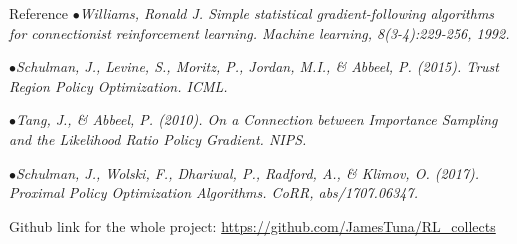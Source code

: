 \begin{frame}{Reference}
    $\bullet$\hspace{0.2cm}\textit{Williams, Ronald J. Simple statistical gradient-following algorithms for connectionist reinforcement learning. Machine learning, 8(3-4):229-256, 1992.}\\\vspace{0.2cm}

    $\bullet$\hspace{0.2cm}\textit{Schulman, J., Levine, S., Moritz, P., Jordan, M.I., \& Abbeel, P. (2015). Trust Region Policy Optimization. ICML.}\\\vspace{0.2cm}

    $\bullet$\hspace{0.2cm}\textit{Tang, J., \& Abbeel, P. (2010). On a Connection between Importance Sampling and the Likelihood Ratio Policy Gradient. NIPS.}\\\vspace{0.2cm}
    
    $\bullet$\hspace{0.2cm}\textit{Schulman, J., Wolski, F., Dhariwal, P., Radford, A., \& Klimov, O. (2017). Proximal Policy Optimization Algorithms. CoRR, abs/1707.06347.}\\\vspace{0.2cm}
    
    \begin{center}Github link for the whole project: \href{https://github.com/JamesTuna/RL_collects}{https://github.com/JamesTuna/RL\_collects}\end{center}

\end{frame}

